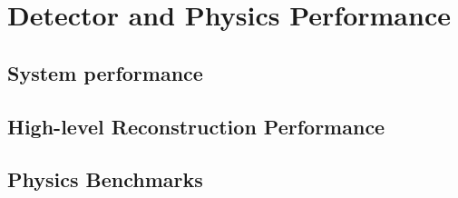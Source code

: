 \newcommand{\fix}[1]{\textcolor{red}{\texttt{#1}}} %


\chapter{Detector and Physics Performance}


\section{\label{sec:system-performance} System performance}




\section{\label{sec:HLR-performance} High-level Reconstruction Performance}



\section{\label{sec:benchmarks} Physics Benchmarks}


